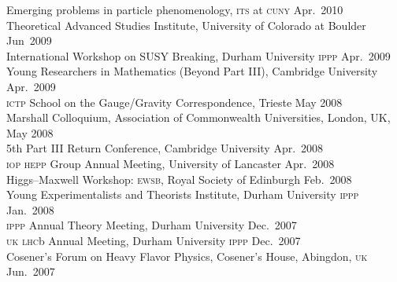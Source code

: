 \documentclass[margin,line]{resume}
\newcommand{\scap}[1]{\textsc{\MakeLowercase{#1}}}
\begin{document}
\begin{resume}
% 
Emerging problems in particle phenomenology, \scap{ITS} at \scap{CUNY}
\hfill 
Apr.~2010\vspace{.7mm}\\
%
Theoretical Advanced Studies Institute, University of Colorado at Boulder
\hfill 
Jun~2009\vspace{.7mm}\\
%
International Workshop on SUSY Breaking, Durham University \scap{IPPP}
\hfill 
Apr.~2009\vspace{.7mm}\\
%
Young Researchers in Mathematics (Beyond Part III), Cambridge University
\hfill 
Apr.~2009\vspace{.7mm}\\
%
\scap{ICTP} School on the Gauge/Gravity Correspondence, Trieste
\hfill 
May 2008\vspace{.7mm}\\
%
Marshall Colloquium, Association of Commonwealth Universities, London, UK, \hfill May 2008\vspace{.7mm}\\
%
5th Part III Return Conference, Cambridge University
\hfill 
Apr.~2008\vspace{.7mm}\\
%
\scap{IOP HEPP} Group Annual Meeting, University of Lancaster
\hfill 
Apr.~2008\vspace{.7mm}\\
%
Higgs--Maxwell Workshop: \scap{EWSB}, Royal Society of Edinburgh
\hfill %
Feb.~2008\vspace{.7mm}\\
%
Young Experimentalists and Theorists Institute, Durham University \scap{IPPP}%
\hfill %
Jan.~2008\vspace{.7mm}\\
%
\scap{IPPP} Annual Theory Meeting, Durham University
\hfill%
Dec.~2007\vspace{.7mm}\\
%
\scap{UK LHC}b Annual Meeting, Durham University \scap{IPPP}
\hfill%
Dec.~2007\vspace{.7mm}\\	
%
Cosener's Forum on Heavy Flavor Physics, Cosener's House, Abingdon, \scap{UK}
\hfill%
Jun.~2007\vspace{.7mm}\\ 


\end{resume}
\end{document}
